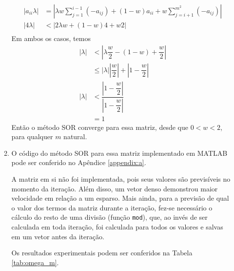 \documentclass{article}
\begin{document}
\begin{enumerate}
\begin{enumerate}
                \begin{align*}
                    |a_{ii} \lambda| &= \left|\lambda w \sum_{j=1}^{i-1} (-a_{ij}) + (1-w)a_{ii} + w \sum_{j=i+1}^{m^2} (-a_{ij})\right| \\
                    |4 \lambda| &< \left|2\lambda w + (1-w)4 + w 2\right| \\
                \end{align*}
                Em ambos os casos, temos
                \begin{align*}
                    |\lambda| &< \left|\lambda \dfrac{w}{2} - (1-w) + \dfrac{w}{2} \right| \\
                    & \le |\lambda| \left|\dfrac{w}{2}\right| + \left|1 - \dfrac{w}{2}\right| \\
                    |\lambda| &< \dfrac{\left|1 - \dfrac{w}{2}\right|}{\left|1 - \dfrac{w}{2}\right|} \\
                    &= 1
                \end{align*}
                Então o método SOR converge para essa matriz, desde que $0 < w < 2$, para qualquer $m$ natural.

            \item O código do método SOR para essa matriz implementado em MATLAB pode ser conferido no Apêndice \ref{appendix:a}.
            
                A matriz em si não foi implementada, pois seus valores são previsíveis no momento da iteração.
                Além disso, um vetor denso demonstrou maior velocidade em relação a um esparso.
                Mais ainda, para a previsão de qual o valor dos termos da matriz durante a iteração, fez-se necessário
                o cálculo do resto de uma divisão (função \lstinline{mod}), que, ao invés de ser calculada em toda iteração,
                foi calculada para todos os valores e salvas em um vetor antes da iteração.

                Os resultados experimentais podem ser conferidos na Tabela \ref{tab:omega_m}.


\end{enumerate}
\end{enumerate}
\end{document}
